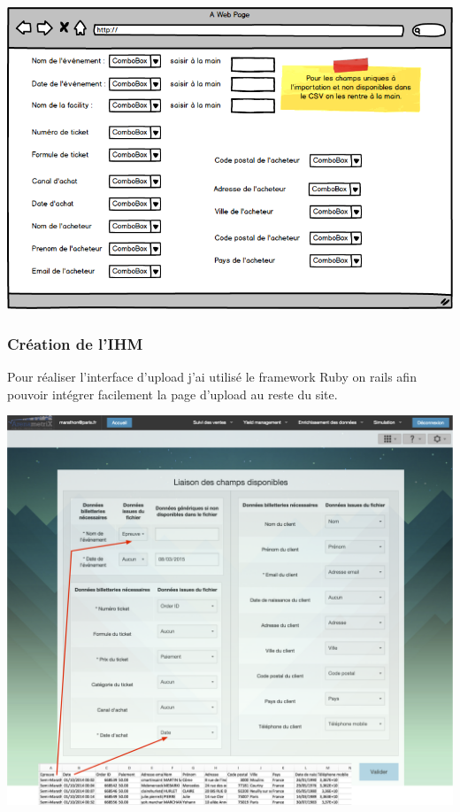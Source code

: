 \begin{center}
\includegraphics[scale=0.55]{images/front3.png}
\label{draft_front_import2}
\end{center}


\subsubsection{Création de l'IHM}
Pour réaliser l'interface d'upload j'ai utilisé le framework Ruby on rails afin pouvoir intégrer facilement la page d'upload au reste du site.

\begin{center}
\includegraphics[scale=0.37]{images/final_front2.png}
\label{final_front_import2}
\end{center}

